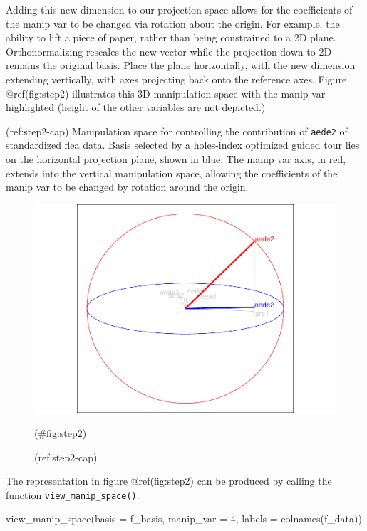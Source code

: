 Adding this new dimension to our projection space allows for the coefficients of the manip var to be changed via rotation about the origin. For example, the ability to lift a piece of paper, rather than being constrained to a 2D plane. Orthonormalizing rescales the new vector while the projection down to 2D remains the original basis. Place the plane horizontally, with the new dimension extending vertically, with axes projecting back onto the reference axes. Figure @ref(fig:step2) illustrates this 3D manipulation space with the manip var highlighted (height of the other variables are not depicted.)

(ref:step2-cap) Manipulation space for controlling the contribution of \texttt{aede2} of standardized flea data. Basis selected by a holes-index optimized guided tour lies on the horizontal projection plane, shown in blue. The manip var axis, in red, extends into the vertical manipulation space, allowing the coefficients of the manip var to be changed by rotation around the origin.

\begin{Schunk}
\begin{figure}

{\centering \includegraphics[width=0.6\linewidth]{spinifex_paper_files/figure-latex/step2-1} 

}

\caption[(ref:step2-cap)]{(ref:step2-cap)}(\#fig:step2)
\end{figure}
\end{Schunk}

The representation in figure @ref(fig:step2) can be produced by calling the function \texttt{view\_manip\_space()}.

\begin{Schunk}
\begin{Sinput}
view_manip_space(basis = f_basis, 
                 manip_var = 4, 
                 labels = colnames(f_data))
\end{Sinput}
\end{Schunk}

